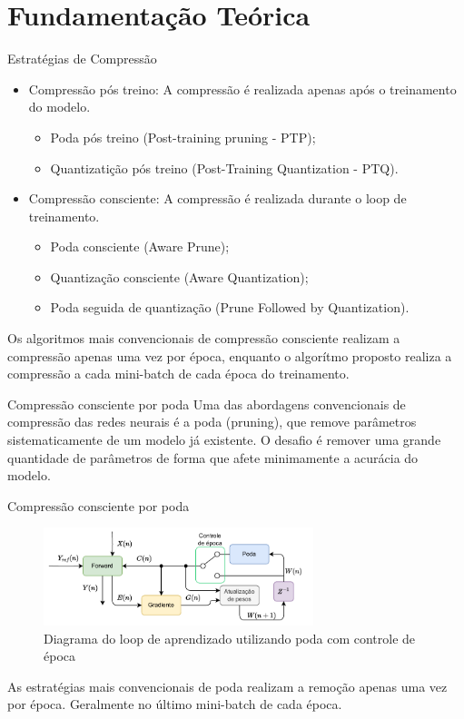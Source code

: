\section{Fundamentação Teórica}
\begin{frame}{Estratégias de Compressão}
    \begin{itemize}
        \item Compressão pós treino: A compressão é realizada apenas após o treinamento do modelo.
        \begin{itemize}
            \item Poda pós treino (Post-training pruning - PTP);
            \item Quantizatição pós treino (Post-Training Quantization - PTQ).
        \end{itemize}
        \item Compressão consciente: A compressão é realizada durante o loop de treinamento.
        \begin{itemize}
            \item Poda consciente (Aware Prune);
            \item Quantização consciente (Aware Quantization);
            \item Poda seguida de quantização (Prune Followed by Quantization).
        \end{itemize}
    \end{itemize}
    Os algoritmos mais convencionais de compressão consciente realizam a compressão apenas uma vez por época, enquanto o algorítmo proposto realiza a compressão a cada mini-batch de cada época do treinamento. 
\end{frame}

\begin{frame}{Compressão consciente por poda}
Uma das abordagens convencionais de compressão das redes neurais é a poda (pruning), que remove parâmetros sistematicamente de um modelo já existente. O desafio é remover uma grande quantidade de parâmetros de forma que afete minimamente a acurácia do modelo.

\end{frame}

\begin{frame}{Compressão consciente por poda}
    \begin{figure}[H]
    \centering
    \includegraphics[width=0.7\textwidth]{figuras/prune_normal_scheme.pdf}
    \caption{Diagrama do loop de aprendizado utilizando poda com controle de época}
    \end{figure}
    As estratégias mais convencionais de poda realizam a remoção apenas uma vez por época. Geralmente no último mini-batch de cada época.
\end{frame}

